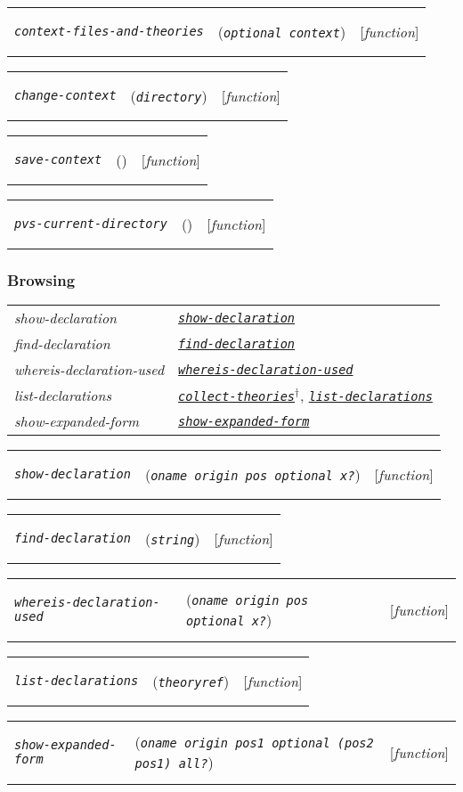 \documentclass[12pt]{book}
\makeatletter
\def\ampoptional{{\smaller\sc {\smaller\smaller \&}optional\ }}
\newenvironment{function}[3]%
{\par\noindent\begin{boxedminipage}{\textwidth}%
 \par\noindent\begin{tabularx}{\linewidth}{l>{\raggedright}Xr}%
 \functionhtgt{#1}&(\texttt{\textit{#2}})&[\emph{#3}]%
 \end{tabularx}\par\flushright\begin{minipage}{.97\textwidth}}
{\end{minipage}\end{boxedminipage}}
\newcommand{\functionnm}[1]{\texttt{\textit{#1}}}
\newcommand{\functionhln}[1]{\hyperlink{#1}{\functionnm{#1}}}
\newcommand{\functionhtgt}[1]{\hypertarget{#1}{\functionnm{#1}}\index{#1@\functionnm{#1}|underline}}
\newenvironment{lispfunction}[2]%
{\begin{function}{#1}{#2}{function}}{\end{function}}
\makeatother
\begin{document}
\begin{lispfunction}{context-files-and-theories}{\ampoptional context}
\end{lispfunction}

\begin{lispfunction}{change-context}{directory}
\end{lispfunction}

\begin{lispfunction}{save-context}{}
\end{lispfunction}

\begin{lispfunction}{pvs-current-directory}{}
\end{lispfunction}


\subsubsection{Browsing}
\noindent\begin{tabularx}{\linewidth}{|>{\itshape\ttfamily}l|>{\raggedright\arraybackslash}X|}\hline
  show-declaration & \functionhln{show-declaration} \\
  find-declaration & \functionhln{find-declaration} \\
  whereis-declaration-used & \functionhln{whereis-declaration-used} \\
  list-declarations & \functionhln{collect-theories}$^\dagger$,
                      \functionhln{list-declarations} \\
  show-expanded-form & \functionhln{show-expanded-form} \\ \hline
\end{tabularx}

\begin{lispfunction}{show-declaration}{oname origin pos \ampoptional x?}
\end{lispfunction}

\begin{lispfunction}{find-declaration}{string}
\end{lispfunction}

\begin{lispfunction}{whereis-declaration-used}
  {oname origin pos \ampoptional x?}
\end{lispfunction}

\begin{lispfunction}{list-declarations}{theoryref}
\end{lispfunction}

\begin{lispfunction}{show-expanded-form}
  {oname origin pos1 \ampoptional (pos2 pos1) all?}
\end{lispfunction}
\end{document}
